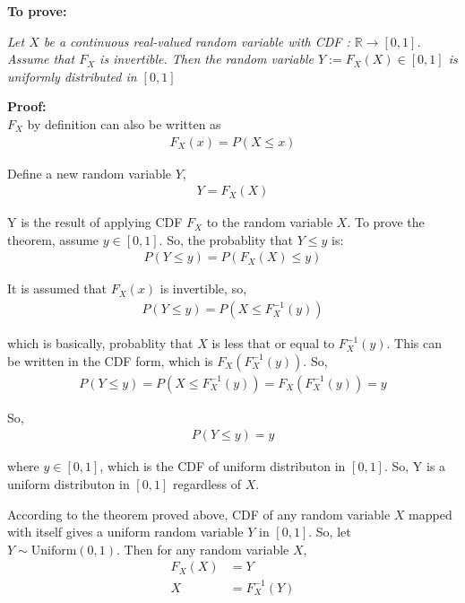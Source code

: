 \begin{solution}



	\textbf{To prove: }

	\emph{Let $X$ be a continuous real-valued random variable with CDF  : $\mathbb{R} \rightarrow [0, 1]$. Assume that
		$F_X$ is invertible. Then the random variable $Y := F_X (X) \in [0, 1]$ is uniformly distributed in $[0, 1]$}

	\textbf{Proof:}\\
	$F_X$ by definition can also be written as
	\begin{align}
		F_X(x) = P(X\leq x)
	\end{align}

	Define a new random variable $Y$,
	\begin{align}
		Y =F_X(X)
	\end{align}

	Y is the result of applying CDF $F_X$ to the random variable $X$. To
	prove the theorem, assume $y\in [0,1]$. So, the probablity that $Y \leq
		y$ is:
	\begin{align}
		P(Y\leq y) = P(F_X(X)\leq y)
	\end{align}

	It is assumed that $F_X(x)$ is invertible, so,
	\begin{align}
		P(Y\leq y) = P(X\leq F_X^{-1}(y))
	\end{align}

	which is basically, probablity that $X$ is less that or equal to $F_X^{-1}(y)$. This can be written in the CDF form, which is $F_X(F_X^{-1}(y))$. So,
	\begin{align}
		P(Y\leq y) = P(X\leq F_X^{-1}(y)) = F_X(F_X^{-1}(y)) = y
	\end{align}

	So,
	\begin{align}
		P(Y\leq y) = y
	\end{align}

	where $y\in [0,1]$, which is the CDF of uniform distributon in $[0,1]$.
	So, Y is a uniform distributon in $[0,1]$ regardless of $X$.




	According to the theorem proved above, CDF of any random variable $X$
	mapped with itself gives a uniform random variable $Y$ in $[0,1]$. So,
	let $Y\sim \text{Uniform}(0,1)$. Then for any random variable $X$,
	\begin{align}
		F_X(X) & = Y           \\
		X      & = F_X^{-1}(Y)
	\end{align}


\end{solution}
